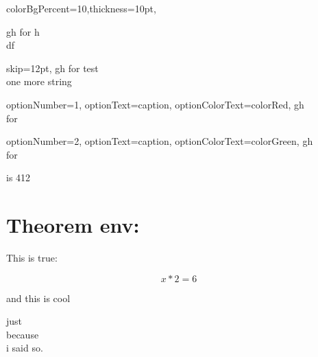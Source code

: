 \documentclass[12pt]{article}
\begin{document}
\begin{Example}{colorBgPercent=10,thickness=10pt,}


    gh for h\\df

    \begin{ExampleTask}{skip=12pt,}
        gh for test\\
        one more string
    \end{ExampleTask}

    \begin{ExampleTask}{
        optionNumber=1,
        optionText=caption,
        optionColorText=colorRed,
    }
        gh\\
        for
    \end{ExampleTask}

    \begin{ExampleTask}{
        optionNumber=2,
        optionText=caption,
        optionColorText=colorGreen,
    }
        gh\\
        for
    \end{ExampleTask}


    \begin{ExampleAnswer}{}
        is 412
    \end{ExampleAnswer}

\end{Example}



\newpage
\section{Theorem env:}



\begin{Theorem}{}


    This is true:


    \begin{tcbraster}[raster columns=3,raster halign=right]
        \centering
        \begin{tbox}[colorTheorem][0cm][2pt][10]
            {\large $$ x * 2 = 6 $$}
        \end{tbox}
    \end{tcbraster}


    and this is cool


    \begin{TheoremProof}{}
        just\\
        because\\
        i said so.
    \end{TheoremProof}

\end{Theorem}
\end{document}
